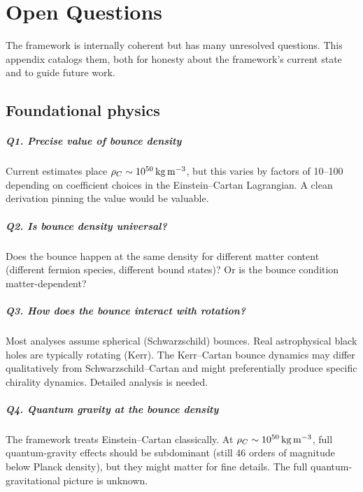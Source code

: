 \chapter{Open Questions}
\label{app:openq}

The framework is internally coherent but has many unresolved questions. This
appendix catalogs them, both for honesty about the framework's current state and
to guide future work.

\section{Foundational physics}

\paragraph{Q1. Precise value of bounce density}
Current estimates place $\rho_{C} \sim 10^{50}\,\mathrm{kg\,m^{-3}}$, but this
varies by factors of 10--100 depending on coefficient choices in the
Einstein--Cartan Lagrangian. A clean derivation pinning the value would be
valuable.

\paragraph{Q2. Is bounce density universal?}
Does the bounce happen at the same density for different matter content
(different fermion species, different bound states)? Or is the bounce condition
matter-dependent?

\paragraph{Q3. How does the bounce interact with rotation?}
Most analyses assume spherical (Schwarzschild) bounces. Real astrophysical black
holes are typically rotating (Kerr). The Kerr--Cartan bounce dynamics may differ
qualitatively from Schwarzschild--Cartan and might preferentially produce
specific chirality dynamics. Detailed analysis is needed.

\paragraph{Q4. Quantum gravity at the bounce density}
The framework treats Einstein--Cartan classically. At
$\rho_{C} \sim 10^{50}\,\mathrm{kg\,m^{-3}}$, full quantum-gravity effects should be
subdominant (still 46 orders of magnitude below Planck density), but they might
matter for fine details. The full quantum-gravitational picture is unknown.

